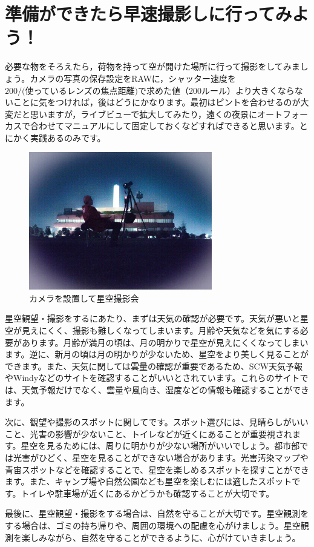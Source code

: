 \documentclass[../../super_nova_2023]{subfiles}
\begin{document}
\section{準備ができたら早速撮影しに行ってみよう！}
必要な物をそろえたら，荷物を持って空が開けた場所に行って撮影をしてみましょう。カメラの写真の保存設定をRAWに，シャッター速度を$200 / \text{(使っているレンズの焦点距離)}$で求めた値（200ルール）より大きくならないことに気をつければ，後はどうにかなります。最初はピントを合わせるのが大変だと思いますが，ライブビューで拡大してみたり，遠くの夜景にオートフォーカスで合わせてマニュアルにして固定しておくなどすればできると思います。とにかく実践あるのみです。
\begin{figure}
	\centering
	\includegraphics[width=8cm]{figures/Yosuke/Hitori.jpg}
	\caption{カメラを設置して星空撮影会}
	\label{fig:Hitori}
\end{figure}
\begin{tcolorbox}[title=星空観望・撮影をいつする？, breakable]
	星空観望・撮影をするにあたり、まずは天気の確認が必要です。天気が悪いと星空が見えにくく、撮影も難しくなってしまいます。月齢や天気などを気にする必要があります。月齢が満月の頃は、月の明かりで星空が見えにくくなってしまいます。逆に、新月の頃は月の明かりが少ないため、星空をより美しく見ることができます。また、天気に関しては雲量の確認が重要であるため、SCW天気予報やWindyなどのサイトを確認することがいいとされています。これらのサイトでは、天気予報だけでなく、雲量や風向き、湿度などの情報も確認することができます。
	
	\phantom{a}\par
	次に、観望や撮影のスポットに関してです。スポット選びには、見晴らしがいいこと、光害の影響が少ないこと、トイレなどが近くにあることが重要視されます。星空を見るためには、周りに明かりが少ない場所がいいでしょう。都市部では光害がひどく、星空を見ることができない場合があります。光害汚染マップや青宙スポットなどを確認することで、星空を楽しめるスポットを探すことができます。また、キャンプ場や自然公園なども星空を楽しむには適したスポットです。トイレや駐車場が近くにあるかどうかも確認することが大切です。
	
	\phantom{a}\par 
	最後に、星空観望・撮影をする場合は、自然を守ることが大切です。星空観測をする場合は、ゴミの持ち帰りや、周囲の環境への配慮を心がけましょう。星空観測を楽しみながら、自然を守ることができるように、心がけていきましょう。
\end{tcolorbox}
\end{document}
